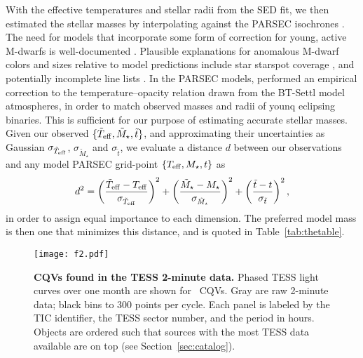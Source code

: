 \documentclass[11pt,twocolumn,tighten]{aastex63}
\begin{document}
With the effective temperatures and stellar radii from the SED fit, we
then estimated the stellar masses by interpolating against the PARSEC
isochrones \citep[v1.2S][]{2014MNRAS.444.2525C}.  The need for models
that incorporate some form of correction for young, active M-dwarfs is
well-documented
\citep[e.g.][]{2012ApJ...756...47S,2015ApJ...804..146D,2016A&A...593A..99F,2020ApJ...891...29S}.
Plausible explanations for anomalous M-dwarf colors and sizes relative
to model predictions include star starspot coverage
\citep[e.g.][]{2017ApJ...836..200G}, and potentially incomplete line
lists \citep[e.g.][]{2013A&A...556A..15R}.  In the PARSEC models,
\citet{2014MNRAS.444.2525C} performed an empirical correction to the
temperature--opacity relation drawn from the BT-Settl model
atmospheres, in order to match observed masses and radii of younq
eclipsing binaries.  This is sufficient for our purpose of estimating
accurate stellar masses.  Given our observed $\{ \tilde{T}_{\rm eff},
\tilde{M}_\star, \tilde{t} \}$, and approximating their uncertainties
as Gaussian $\sigma_{\tilde{T}_{\rm eff}}$, $\sigma_{\tilde{M}_\star}$
and $\sigma_{\tilde{t}}$, we evaluate a distance $d$ between our
observations and any model PARSEC grid-point $\{ T_{\rm eff}, M_\star,
t \}$ as
\begin{equation}
  d^2 = 
  \left( \frac{\tilde{T}_{\rm eff} - T_{\rm eff}}{\sigma_{\tilde{T}_{\rm eff}}} \right)^2
  +
  \left( \frac{\tilde{M}_{\star} - M_{\star}}{\sigma_{\tilde{M}_{\star}}} \right)^2
  +
  \left( \frac{\tilde{t} - t}{\sigma_{\tilde{t}}} \right)^2,
\end{equation}
in order to assign equal importance to each dimension.  The preferred
model mass is then one that minimizes this distance, and is quoted in
Table~\ref{tab:thetable}.


\begin{figure*}[!tp]
	\begin{center}
		\centering
		\texttt{[image: f2.pdf]}
    \vspace{-0.7cm}
		\caption{
      {\bf CQVs found in the TESS 2-minute data.}
      Phased TESS light curves over one month are shown for \ngoods\
      CQVs.  Gray are raw 2-minute data; black bins to 300 points per
      cycle.  Each panel is labeled by the TIC identifier, the TESS
      sector number, and the period in hours.  Objects are ordered
      such that sources with the most TESS data available are on top
      (see Section~\ref{sec:catalog}).
		}
		\label{fig:cqvs}
	\end{center}
\end{figure*}
\end{document}
